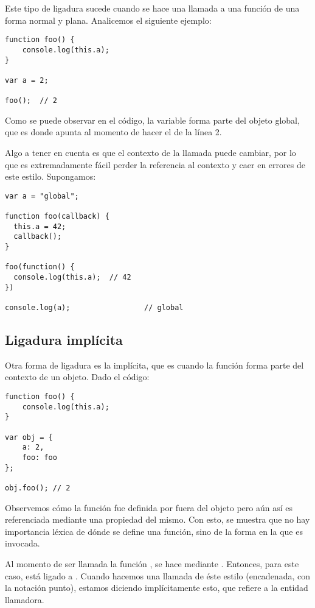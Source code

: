 Este tipo de ligadura sucede cuando se hace una llamada a una función de una forma normal y plana. Analicemos el siguiente ejemplo:

\begin{lstlisting}[title={Ligadura por defecto}]
function foo() {
	console.log(this.a);
}

var a = 2;

foo();  // 2
\end{lstlisting}

Como se puede observar en el código, la variable  forma parte del objeto global, que es donde apunta  al momento de hacer el  de la línea 2.

Algo a tener en cuenta es que el contexto de la llamada puede cambiar, por lo que es extremadamente fácil perder la referencia al contexto y caer en errores de este estilo. Supongamos:

\begin{lstlisting}
var a = "global";

function foo(callback) {
  this.a = 42;
  callback();
}

foo(function() {
  console.log(this.a);	// 42
})

console.log(a);					// global
\end{lstlisting}

\subsection{Ligadura implícita}

Otra forma de ligadura es la implícita, que es cuando la función forma parte del contexto de un objeto. Dado el código:

\begin{lstlisting}[title={Ligadura implícita}]
function foo() {
	console.log(this.a);
}

var obj = {
	a: 2,
	foo: foo
};

obj.foo(); // 2
\end{lstlisting}

Observemos cómo la función  fue definida por fuera del objeto  pero aún así es referenciada mediante una propiedad del mismo. Con esto, se muestra que no hay importancia léxica de dónde se define una función, sino de la forma en la que es invocada.

Al momento de ser llamada la función , se hace mediante . Entonces, para este caso,  está ligado a . Cuando hacemos una llamada de éste estilo (encadenada, con la notación punto), estamos diciendo implícitamente esto, que  refiere a la entidad llamadora.

